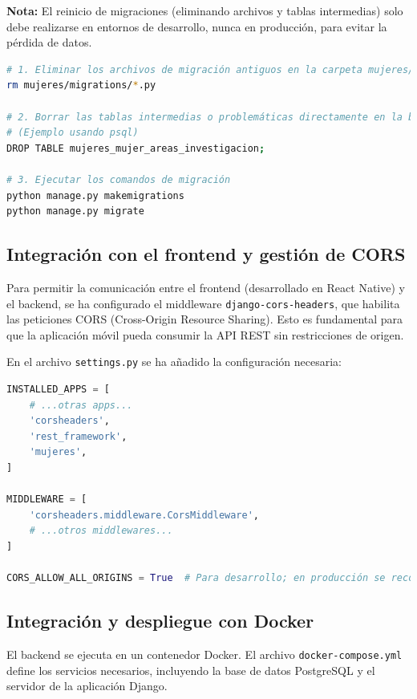 \textbf{Nota:} El reinicio de migraciones (eliminando archivos y tablas intermedias) solo debe realizarse en entornos de desarrollo, nunca en producción, para evitar la pérdida de datos.

\begin{lstlisting}[language=bash, caption={Pasos para reiniciar migraciones}]
# 1. Eliminar los archivos de migración antiguos en la carpeta mujeres/migrations/
rm mujeres/migrations/*.py

# 2. Borrar las tablas intermedias o problemáticas directamente en la base de datos PostgreSQL.
# (Ejemplo usando psql)
DROP TABLE mujeres_mujer_areas_investigacion;

# 3. Ejecutar los comandos de migración
python manage.py makemigrations
python manage.py migrate
\end{lstlisting}

\subsection{Integración con el frontend y gestión de CORS}

Para permitir la comunicación entre el frontend (desarrollado en React Native) y el backend, se ha configurado el middleware \texttt{django-cors-headers}, que habilita las peticiones CORS (Cross-Origin Resource Sharing). Esto es fundamental para que la aplicación móvil pueda consumir la API REST sin restricciones de origen.

En el archivo \texttt{settings.py} se ha añadido la configuración necesaria:

\begin{lstlisting}[language=Python, caption={Configuración de CORS en Django}]
INSTALLED_APPS = [
    # ...otras apps...
    'corsheaders',
    'rest_framework',
    'mujeres',
]

MIDDLEWARE = [
    'corsheaders.middleware.CorsMiddleware',
    # ...otros middlewares...
]

CORS_ALLOW_ALL_ORIGINS = True  # Para desarrollo; en producción se recomienda restringir los orígenes permitidos
\end{lstlisting}

\subsection{Integración y despliegue con Docker}

El backend se ejecuta en un contenedor Docker. El archivo \texttt{docker-compose.yml} define los servicios necesarios, incluyendo la base de datos PostgreSQL y el servidor de la aplicación Django. 

